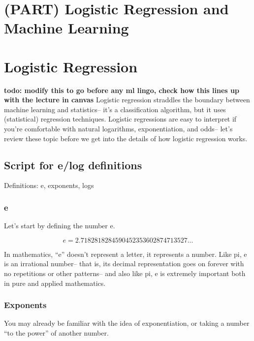 \documentclass[]{article}
\title{}
\author{}
\date{}
\begin{document}
\section*{(PART) Logistic Regression and Machine
Learning}\label{part-logistic-regression-and-machine-learning}

\section{Logistic Regression}\label{logistic-regression}

\textbf{todo: modify this to go before any ml lingo, check how this
lines up with the lecture in canvas} Logistic regression straddles the
boundary between machine learning and statistics-- it's a classification
algorithm, but it uses (statistical) regression techniques. Logistic
regressions are easy to interpret if you're comfortable with natural
logarithms, exponentiation, and odds-- let's review these topic before
we get into the details of how logistic regression works.

\subsection{Script for e/log
definitions}\label{script-for-elog-definitions}

Definitions: e, exponents, logs

\subsubsection{e}\label{e}

Let's start by defining the number e.

\[ e = 2.7182818284590452353602874713527... \]

In mathematics, ``e'' doesn't represent a letter, it represents a
number. Like pi, e is an irrational number-- that is, its decimal
representation goes on forever with no repetitions or other patterns--
and also like pi, e is extremely important both in pure and applied
mathematics.

\subsubsection{Exponents}\label{exponents}

You may already be familiar with the idea of exponentiation, or taking a
number ``to the power'' of another number.
\end{document}
